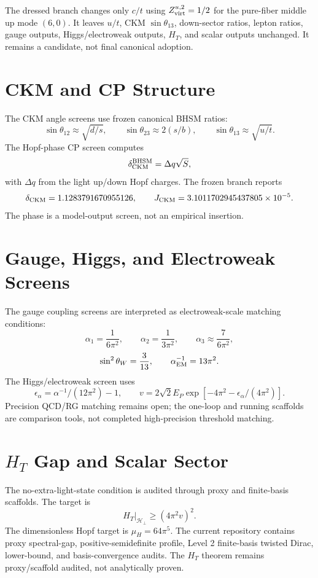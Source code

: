 \documentclass[11pt]{article}
\newcommand{\BHSM}{BHSM}
\newcommand{\HT}{\ensuremath{H_T}}
\begin{document}
The dressed branch changes only $c/t$ using $Z_{\rm virt}^{u,2}=1/2$ for the
pure-fiber middle up mode $(6,0)$. It leaves $u/t$, CKM $\sin\theta_{13}$,
down-sector ratios, lepton ratios, gauge outputs, Higgs/electroweak outputs,
\HT{}, and scalar outputs unchanged. It remains a candidate, not final
canonical adoption.

\section{CKM and CP Structure}

The CKM angle screens use frozen canonical \BHSM{} ratios:
\[
  \sin\theta_{12}\approx\sqrt{d/s},\qquad
  \sin\theta_{23}\approx 2(s/b),\qquad
  \sin\theta_{13}\approx\sqrt{u/t}.
\]
The Hopf-phase CP screen computes
\[
  \delta_{\rm CKM}^{\rm BHSM}=\Delta q\sqrt{S},
\]
with $\Delta q$ from the light up/down Hopf charges. The frozen branch reports
\[
  \delta_{\rm CKM}=1.1283791670955126,\qquad
  J_{\rm CKM}=3.1011702945437805\times10^{-5}.
\]
The phase is a model-output screen, not an empirical insertion.

\section{Gauge, Higgs, and Electroweak Screens}

The gauge coupling screens are interpreted as electroweak-scale matching
conditions:
\[
  \alpha_1=\frac{1}{6\pi^2},\qquad
  \alpha_2=\frac{1}{3\pi^2},\qquad
  \alpha_3\approx\frac{7}{6\pi^2},
\]
\[
  \sin^2\theta_W=\frac{3}{13},\qquad
  \alpha_{\rm EM}^{-1}=13\pi^2.
\]
The Higgs/electroweak screen uses
\[
  \epsilon_\alpha=\alpha^{-1}/(12\pi^2)-1,\qquad
  v=2\sqrt{2}E_P\exp[-4\pi^2-\epsilon_\alpha/(4\pi^2)].
\]
Precision QCD/RG matching remains open; the one-loop and running scaffolds are
comparison tools, not completed high-precision threshold matching.

\section{\texorpdfstring{$H_T$}{H\_T} Gap and Scalar Sector}

The no-extra-light-state condition is audited through proxy and finite-basis
scaffolds. The target is
\[
  H_T|_{\mathcal H_\perp}\ge (4\pi^2v)^2.
\]
The dimensionless Hopf target is $\mu_H=64\pi^5$. The current repository
contains proxy spectral-gap, positive-semidefinite profile, Level 2 finite-basis
twisted Dirac, lower-bound, and basis-convergence audits. The \HT{} theorem
remains proxy/scaffold audited, not analytically proven.
\end{document}
